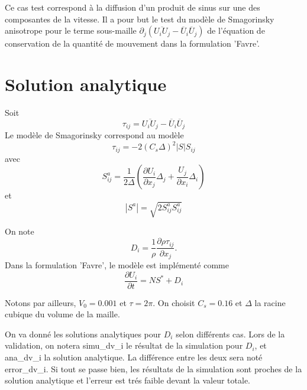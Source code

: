Ce cas test correspond \`a la diffusion d'un produit de sinus sur une des composantes de la vitesse. Il a pour but le test du mod\`ele de Smagorinsky anisotrope pour le terme sous-maille $\partial_j\left(\overline{U_i U_j} - \overline{U}_i\overline{U}_j\right)$ de l'\'equation de conservation de la quantit\'e de mouvement dans la formulation 'Favre'.

\section{Solution analytique}

Soit
\begin{equation}
\tau_{ij} = \overline{U_i U_j} - \overline{U}_i\overline{U}_j
\end{equation}
Le mod\`ele de Smagorinsky correspond au mod\`ele
\begin{equation}
\tau_{ij} = - 2 \left(C_s \Delta\right)^2 \left|S\right| S_{ij}
\end{equation}
avec
\begin{equation}
S^a_{ij} = \frac{1}{2 \Delta}\left(\frac{\partial U_i}{\partial x_j} \Delta_j + \frac{U_j}{\partial x_i} \Delta_i\right)
\end{equation}
et
\begin{equation}
\left|S^a\right| = \sqrt{2 S_{ij}^a S_{ij}^a}
\end{equation}

On note
\begin{equation}
D_i = \frac{1}{\rho} \frac{\partial \rho \tau_{ij}}{\partial x_j}.
\end{equation}
Dans la formulation 'Favre', le mod\`ele est impl\'ement\'e comme
\begin{equation}
\frac{\partial U_{i}}{\partial t} = NS^* + D_i
\end{equation}

Notons par ailleurs, $V_0 = 0.001$ et $\tau=2\pi$. On choisit $C_s=0.16$ et $\Delta$ la racine cubique du volume de la maille.

On va donn\'e les solutions analytiques pour $D_i$ selon diff\'erents cas.
Lors de la validation, on notera {\textsf simu\_dv\_i} le r\'esultat de la
simulation pour $D_i$, et {\textsf ana\_dv\_i} la solution analytique.
La diff\'erence entre les deux sera not\'e \textsf{error\_dv\_i}. Si tout se passe bien, les r\'esultats de la simulation sont proches de la solution analytique et l'erreur est tr\'es faible devant la valeur totale.



